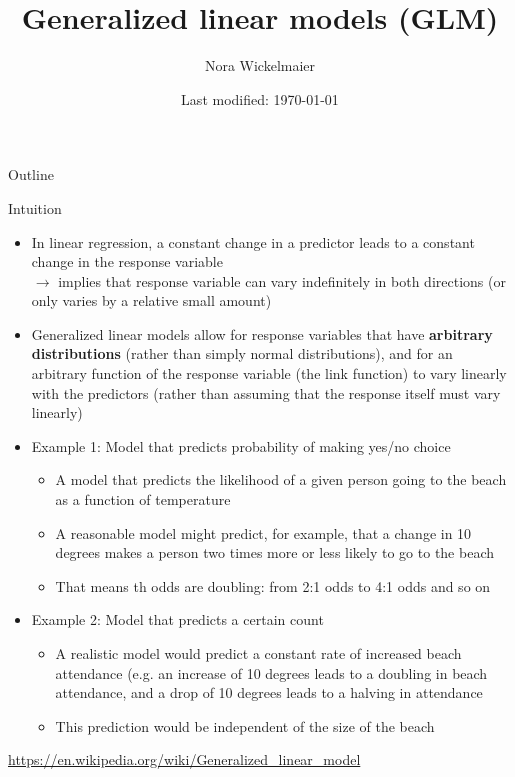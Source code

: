 \documentclass[aspectratio=169]{beamer}
\title{Generalized linear models (GLM)}
\author{Nora Wickelmaier}
\date{Last modified: \today}
\begin{document}
\begin{frame}{}
\thispagestyle{empty}
\titlepage
\end{frame}

\begin{frame}{Outline}
\tableofcontents
\end{frame}

\begin{frame}[allowframebreaks]{Intuition}
  \begin{itemize}
    \item In linear regression, a constant change in a predictor leads to a
      constant change in the response variable\\
        $\to$ implies that response variable can vary indefinitely in both
          directions (or only varies by a relative small amount)
    \item Generalized linear models allow for response variables that have
      \textbf{arbitrary distributions} (rather than simply normal
      distributions), and for an arbitrary function of the response
      variable (the link function) to vary linearly with the predictors
      (rather than assuming that the response itself must vary linearly)
      \framebreak
    \item Example 1: Model that predicts probability of making yes/no
      choice
      \begin{itemize}
        \item A model that predicts the likelihood of a given person going
          to the beach as a function of temperature
        \item A reasonable model might predict, for example, that a change
          in 10 degrees makes a person two times more or less likely to go
          to the beach
        \item That means th odds are doubling: from 2:1 odds to 4:1 odds
          and so on
      \end{itemize}
    \item Example 2: Model that predicts a certain count
      \begin{itemize}
        \item A realistic model would predict a constant rate of
          increased beach attendance (e.g. an increase of 10 degrees leads
          to a doubling in beach attendance, and a drop of 10 degrees leads
          to a halving in attendance
        \item This prediction would be independent of the size of the beach
      \end{itemize}
  \end{itemize}
  \vspace{.5cm}
{\footnotesize\url{https://en.wikipedia.org/wiki/Generalized_linear_model}}
\end{frame}
\end{document}
